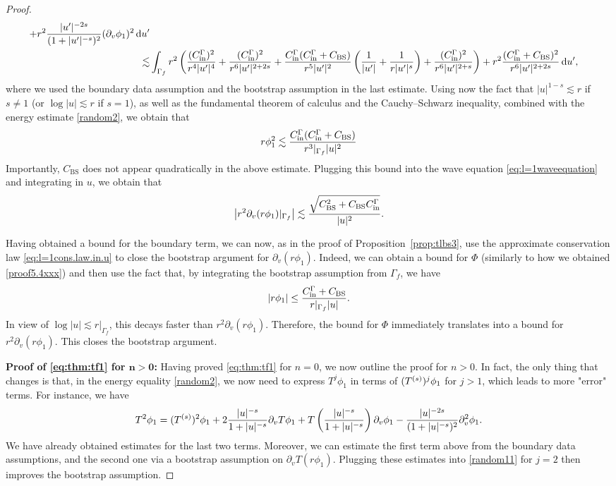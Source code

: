 \documentclass[11pt,english]{article}
\numberwithin{equation}{section}
\theoremstyle{remark}
\theoremstyle{plain}
\theoremstyle{remark}
\newcommand{\dd}{\mathop{}\!\mathrm{d}}
\newcommand{\pv}{\partial_v}
\renewcommand{\(}{\left(}
\renewcommand{\)}{\right)}
\newcommand{\pho}{(r\phi_1)}
\begin{document}
\begin{proof}
\begin{align*}
				+r^2 \frac{|u'|^{-2s}}{(1+|u'|^{-s})^2}	(\pv\phi_1)^2					\dd u'\\
\lesssim& \int_{\Gamma_f} r^2 \left(\frac{(\cin)^2}{r^4|u'|^4}+\frac{(\cin)^2}{r^6|u'|^{2+2s}} +\frac{\cin(\cin+C_{\mathrm{BS}})}{r^5|u'|^2}\left(\frac{1}{|u'|}+\frac{1}{r|u'|^{s}}\right)+\frac{(\cin)^2}{r^6|u'|^{2+s}}\right)%
				+r^2 \frac{(\cin+C_{\mathrm{BS}})^2}{r^6|u'|^{2+2s}}				\dd u' ,
\end{align*}
where we used the boundary data assumption and the bootstrap assumption in the last estimate. Using now the fact that $|u|^{1-s}\lesssim r$ if $s\neq 1$ (or $\log |u|\lesssim r$ if $s=1$), as well as the fundamental theorem of calculus and the Cauchy--Schwarz inequality, combined with the energy estimate \eqref{random2}, we obtain that
\begin{align}
r\phi_1^2\lesssim \frac{\cin(\cin+C_{\mathrm{BS}})}{r^3|_{\Gamma_f}|u|^2}%
\end{align}
Importantly, $C_{\mathrm{BS}}$ does not appear quadratically in the above estimate. Plugging this bound into the wave equation \eqref{eq:l=1waveequation} and integrating in $u$, we obtain that
\begin{equation}
\left|r^2\pv(r\phi_1)|_{\Gamma_f}\right| \lesssim \frac{\sqrt{C_{\mathrm{BS}}^2+C_{\mathrm{BS}}\cin}}{|u|^2}.
\end{equation}

Having obtained a bound for the boundary term, we can now, as in the proof of Proposition~\ref{prop:tlbs3}, use the approximate conservation law \eqref{eq:l=1cons.law.in.u} to close the bootstrap argument for $\pv(r\phi_1)$. Indeed, we can obtain a bound for $\Phi$ (similarly to how we obtained \eqref{proof5.4xxx}) and then use the fact that, by integrating the bootstrap assumption from $\Gamma_f$, we have
\begin{equation}
|r\phi_1|\leq \frac{C_{\mathrm{in}}^\Gamma+C_{\mathrm{BS}}}{r|_{\Gamma_f}|u|}.
\end{equation}
In view of $\log |u|\lesssim r|_{\Gamma_f}$, this decays faster than $r^2\pv(r\phi_1)$. Therefore, the bound for $\Phi$ immediately translates into a bound for $r^2\pv\pho$. This closes the bootstrap argument.

\textbf{Proof of \eqref{eq:thm:tf1} for $\mathbf{n>0}$:}
Having proved \eqref{eq:thm:tf1} for $n=0$, we now outline the proof for $n>0$. In fact, the only thing that changes is that, in the energy equality \eqref{random2}, we now need to express $T^j\phi_1$ in terms of $(T^{(s)})^j\phi_1$ for $j>1$, which leads to more "error" terms.
For instance, we have
\begin{equation}
T^2\phi_1=(\te)^2\phi_1+2\frac{|u|^{-s}}{1+|u|^{-s}}\pv T\phi_1+T\left(\frac{|u|^{-s}}{1+|u|^{-s}}\right)\pv\phi_1-\frac{|u|^{-2s}}{(1+|u|^{-s})^2}\pv^2\phi_1.
\end{equation}
We  have already obtained estimates for the last two terms. 
Moreover, we can estimate the first term above from the boundary data assumptions, and the second one via a bootstrap assumption on $\pv T(r\phi_1)$. 
Plugging these estimates into \eqref{random11} for $j=2$ then improves the bootstrap assumption.


\end{proof}
\end{document}
